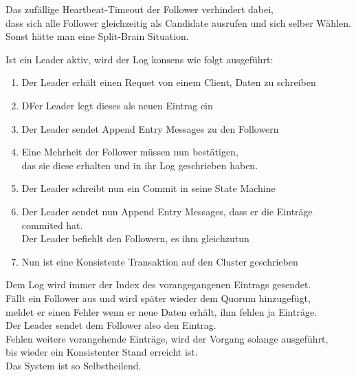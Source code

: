 \begin{flushleft}
    Das zufällige Heartbeat-Timeout der Follower verhindert dabei,\\
    dass sich alle Follower gleichzeitig als Candidate ausrufen und sich selber Wählen.\\
    Sonst hätte man eine Split-Brain Situation.
\end{flushleft}
\begin{flushleft}
    Ist ein Leader aktiv, wird der Log konsens wie folgt ausgeführt:
    \begin{enumerate}
        \item Der Leader erhält einen Requet von einem Client, Daten zu schreiben
        \item DFer Leader legt dieses als neuen Eintrag ein
        \item Der Leader sendet Append Entry Messages zu den Followern
        \item Eine Mehrheit der Follower müssen nun bestätigen,\\das sie diese erhalten und in ihr Log geschrieben haben.
        \item Der Leader schreibt nun ein Commit in seine \Gls{State Machine}
        \item Der Leader sendet nun Append Entry Messages, dass er die Einträge commited hat.\\Der Leader befiehlt den Followern, es ihm gleichzutun
        \item Nun ist eine Konsistente Transaktion auf den Cluster geschrieben
    \end{enumerate}
\end{flushleft}
\begin{flushleft}
    Dem Log wird immer der Index des vorangegangenen Eintrags gesendet.\\
    Fällt ein Follower aus und wird später wieder dem \Gls{Quorum} hinzugefügt,\\
    meldet er einen Fehler wenn er neue Daten erhält, ihm fehlen ja Einträge.\\
    Der Leader sendet dem Follower also den Eintrag.\\
    Fehlen weitere vorangehende Einträge, wird der Vorgang solange ausgeführt,\\
    bis wieder ein Konsistenter Stand erreicht ist.\\
    Das System ist so Selbstheilend.
\end{flushleft}